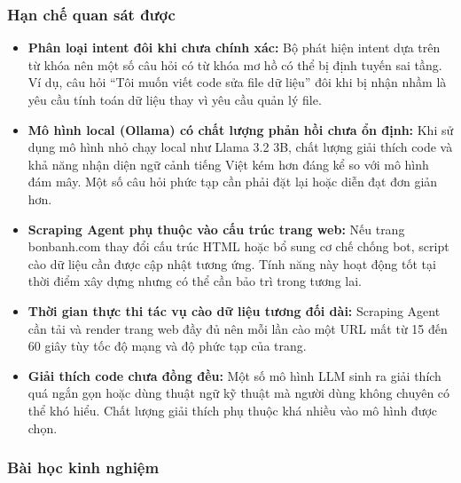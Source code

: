\subsubsection{Hạn chế quan sát được}
\label{subsubsec:ai_cons}

\begin{itemize}
    \item \textbf{Phân loại intent đôi khi chưa chính xác:} Bộ phát hiện intent dựa trên từ khóa nên một số câu hỏi có từ khóa mơ hồ có thể bị định tuyến sai tầng. Ví dụ, câu hỏi ``Tôi muốn viết code sửa file dữ liệu'' đôi khi bị nhận nhầm là yêu cầu tính toán dữ liệu thay vì yêu cầu quản lý file.

    \item \textbf{Mô hình local (Ollama) có chất lượng phản hồi chưa ổn định:} Khi sử dụng mô hình nhỏ chạy local như Llama 3.2 3B, chất lượng giải thích code và khả năng nhận diện ngữ cảnh tiếng Việt kém hơn đáng kể so với mô hình đám mây. Một số câu hỏi phức tạp cần phải đặt lại hoặc diễn đạt đơn giản hơn.

    \item \textbf{Scraping Agent phụ thuộc vào cấu trúc trang web:} Nếu trang bonbanh.com thay đổi cấu trúc HTML hoặc bổ sung cơ chế chống bot, script cào dữ liệu cần được cập nhật tương ứng. Tính năng này hoạt động tốt tại thời điểm xây dựng nhưng có thể cần bảo trì trong tương lai.

    \item \textbf{Thời gian thực thi tác vụ cào dữ liệu tương đối dài:} Scraping Agent cần tải và render trang web đầy đủ nên mỗi lần cào một URL mất từ 15 đến 60 giây tùy tốc độ mạng và độ phức tạp của trang.

    \item \textbf{Giải thích code chưa đồng đều:} Một số mô hình LLM sinh ra giải thích quá ngắn gọn hoặc dùng thuật ngữ kỹ thuật mà người dùng không chuyên có thể khó hiểu. Chất lượng giải thích phụ thuộc khá nhiều vào mô hình được chọn.
\end{itemize}

\subsubsection{Bài học kinh nghiệm}
\label{subsubsec:ai_lessons}

